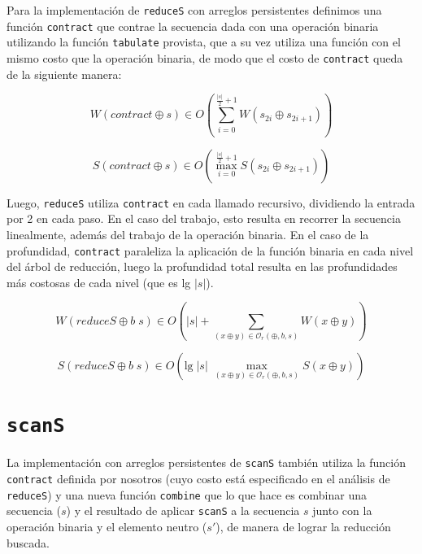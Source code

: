 \documentclass[a4paper,10pt]{article}
\begin{document}
Para la implementación de \texttt{reduceS} con arreglos persistentes definimos
una función \texttt{contract} que contrae la secuencia dada con una operación
binaria utilizando la función \texttt{tabulate} provista, que a su vez utiliza
una función con el mismo costo que la operación binaria, de modo que el costo
de \texttt{contract} queda de la siguiente manera:

\begin{equation*}
    W \left( contract \oplus s \right) \in
    O \left( \sum_{i=0}^{\frac{\vert s \vert}{2} + 1} W \left( s_{2i} \oplus s_{2i+1} \right) \right)
\end{equation*}

\begin{equation*}
    S \left( contract \oplus s \right) \in
    O \left( \max_{i=0}^{\frac{\vert s \vert}{2} + 1} S \left( s_{2i} \oplus s_{2i+1} \right) \right)
\end{equation*}

Luego, \texttt{reduceS} utiliza \texttt{contract} en cada llamado recursivo,
dividiendo la entrada por 2 en cada paso. En el caso del trabajo, esto resulta
en recorrer la secuencia linealmente, además del trabajo de la operación binaria.
En el caso de la profundidad, \texttt{contract} paraleliza la aplicación de la
función binaria en cada nivel del árbol de reducción, luego la profundidad total
resulta en las profundidades más costosas de cada nivel (que es lg $\vert s \vert$).

\begin{equation*}
    W \left( reduceS \oplus b \; s \right) \in
    O \left( \vert s \vert + \sum_{(x \oplus y) \in \mathcal{O}_r(\oplus,b,s)} W \left( x \oplus y \right) \right)
\end{equation*}

\begin{equation*}
    S \left( reduceS \oplus b \; s \right) \in
    O \left( \text{lg} \; \vert s \vert \; \max_{(x \oplus y) \in \mathcal{O}_r(\oplus,b,s)} S \left( x \oplus y \right) \right)
\end{equation*}

\section*{\texttt{scanS}}

La implementación con arreglos persistentes de \texttt{scanS} también utiliza
la función \texttt{contract} definida por nosotros (cuyo costo está especificado
en el análisis de \texttt{reduceS}) y una nueva función \texttt{combine} que lo
que hace es combinar una secuencia ($s$) y el resultado de aplicar \texttt{scanS}
a la secuencia $s$ junto con la operación binaria y el elemento neutro ($s'$), de
manera de lograr la reducción buscada.
\end{document}
